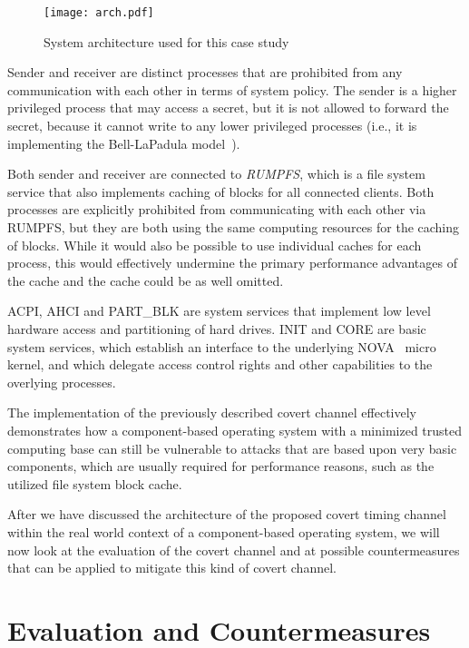 \documentclass[runningheads,a4paper]{llncs}
\begin{document}
\begin{figure}[!ht]
\texttt{[image: arch.pdf]}
\caption{System architecture used for this case study}
\label{arch}
\end{figure}

Sender and receiver are distinct processes that are prohibited from any communication with each other in terms of system policy.
The sender is a higher privileged process that may access a secret, but it is not allowed to forward the secret, because it cannot write to any lower privileged processes (i.e., it is implementing the Bell-LaPadula model~\cite{bell1973}).

Both sender and receiver are connected to \emph{RUMPFS}, which is a file system service that also implements caching of blocks for all connected clients.
Both processes are explicitly prohibited from communicating with each other via RUMPFS, but they are both using the same computing resources for the caching of blocks.
While it would also be possible to use individual caches for each process, this would effectively undermine the primary performance advantages of the cache and the cache could be as well omitted.

ACPI, AHCI and PART\_BLK are system services that implement low level hardware access and partitioning of hard drives.
INIT and CORE are basic system services, which establish an interface to the underlying NOVA~\cite{Steinberg:2010:NMS:1755913.1755935} micro kernel, and which delegate access control rights and other capabilities to the overlying processes.

The implementation of the previously described covert channel effectively demonstrates how a component-based operating system with a minimized trusted computing base can still be vulnerable to attacks that are based upon very basic components, which are usually required for performance reasons, such as the utilized file system block cache.
 
After we have discussed the architecture of the proposed covert timing channel within the real world context of a component-based operating system, we will now look at the evaluation of the covert channel and at possible countermeasures that can be applied to mitigate this kind of covert channel.

\section{Evaluation and Countermeasures}\label{sec5}
\end{document}
